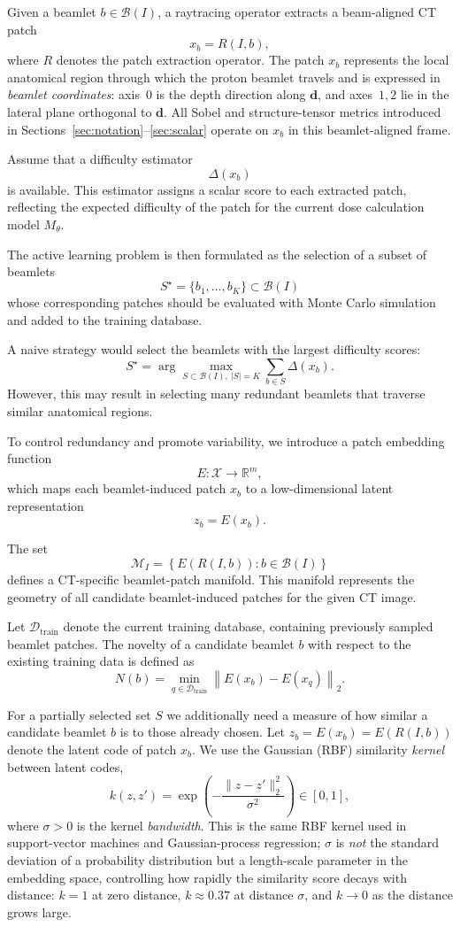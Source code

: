 \documentclass[11pt,a4paper]{article}
\begin{document}
Given a beamlet \(b \in \mathcal{B}(I)\), a raytracing operator extracts a
beam-aligned CT patch
\[
x_b = R(I,b),
\]
where \(R\) denotes the patch extraction operator. The patch \(x_b\) represents
the local anatomical region through which the proton beamlet travels and is
expressed in \emph{beamlet coordinates}: axis~$0$ is the depth direction along
\(\mathbf{d}\), and axes~$1,2$ lie in the lateral plane orthogonal to
\(\mathbf{d}\).  All Sobel and structure-tensor metrics introduced in
Sections~\ref{sec:notation}--\ref{sec:scalar} operate on \(x_b\) in this
beamlet-aligned frame.

Assume that a difficulty estimator
\[
\Delta(x_b)
\]
is available. This estimator assigns a scalar score to each extracted patch,
reflecting the expected difficulty of the patch for the current dose calculation
model \(M_{\theta}\).

The active learning problem is then formulated as the selection of a subset of
beamlets
\[
S^\star = \{b_1,\ldots,b_K\} \subset \mathcal{B}(I)
\]
whose corresponding patches should be evaluated with Monte Carlo simulation and
added to the training database.

A naive strategy would select the beamlets with the largest difficulty scores:
\[
S^\star
=
\arg\max_{S \subset \mathcal{B}(I), \ |S|=K}
\sum_{b \in S} \Delta(x_b).
\]
However, this may result in selecting many redundant beamlets that traverse
similar anatomical regions.

To control redundancy and promote variability, we introduce a patch embedding
function
\[
E : \mathcal{X} \rightarrow \mathbb{R}^m,
\]
which maps each beamlet-induced patch \(x_b\) to a low-dimensional latent
representation
\[
z_b = E(x_b).
\]

The set
\[
\mathcal{M}_I
=
\left\{
E(R(I,b)) : b \in \mathcal{B}(I)
\right\}
\]
defines a CT-specific beamlet-patch manifold. This manifold represents the
geometry of all candidate beamlet-induced patches for the given CT image.

Let \(\mathcal{D}_{\mathrm{train}}\) denote the current training database,
containing previously sampled beamlet patches. The novelty of a candidate
beamlet \(b\) with respect to the existing training data is defined as
\[
N(b)
=
\min_{q \in \mathcal{D}_{\mathrm{train}}}
\left\|
E(x_b) - E(x_q)
\right\|_2.
\]

For a partially selected set \(S\) we additionally need a measure of how
similar a candidate beamlet \(b\) is to those already chosen.  Let
\(z_b = E(x_b) = E(R(I,b))\) denote the latent code of patch \(x_b\).  We
use the Gaussian (RBF) similarity \emph{kernel} between latent codes,
\[
   k(z, z') = \exp\!\left(-\frac{\|z - z'\|_2^2}{\sigma^2}\right) \in [0, 1],
\]
where \(\sigma > 0\) is the kernel \emph{bandwidth}.  This is the same RBF
kernel used in support-vector machines and Gaussian-process regression;
\(\sigma\) is \emph{not} the standard deviation of a probability
distribution but a length-scale parameter in the embedding space,
controlling how rapidly the similarity score decays with distance:
\(k = 1\) at zero distance, \(k \approx 0.37\) at distance \(\sigma\), and
\(k \to 0\) as the distance grows large.
\end{document}

